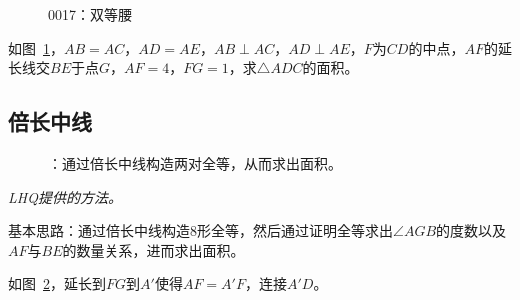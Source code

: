 

\begin{figure}[htbp]
  \centering
  \caption{0017：双等腰} \label{fig:0017}
\end{figure}

如图~\ref{fig:0017}，$AB = AC$，$AD = AE$，$AB \perp AC$，$AD \perp AE$，$F$为$CD$的中点，$AF$的延长线交$BE$于点$G$，$AF = 4$，$FG = 1$，求$\triangle ADC$的面积。


\subsection{倍长中线} \label{subsec:0017-mid}

\begin{figure}[htbp]
  \centering
  \caption{：通过倍长中线构造两对全等，从而求出面积。}
  \label{fig:0017-mid}
\end{figure}

\emph{LHQ提供的方法。}

基本思路：通过倍长中线构造8形全等，然后通过证明全等求出$\angle AGB$的度数以及$AF$与$BE$的数量关系，进而求出面积。

如图~\ref{fig:0017-mid}，延长到$FG$到$A'$使得$AF = A'F$，连接$A'D$。

